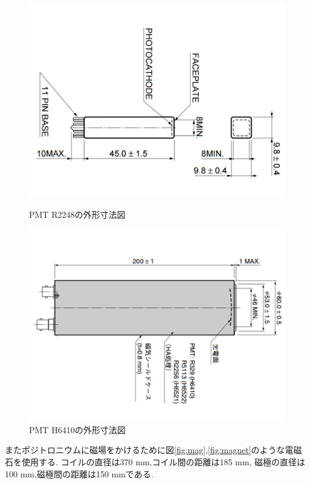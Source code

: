 \begin{figure}[htbp]
\begin{minipage}{0.5\hsize}
\centering
\includegraphics[keepaspectratio,angle=90,scale=0.4]{fig/ybm/pmtmini.pdf}
	\caption{PMT R2248の外形寸法図\cite{pmtshape}}
\label{fig:pmtmini}
\end{minipage}
\begin{minipage}{0.5\hsize}
\centering
\includegraphics[keepaspectratio,angle=90,scale=0.4]{fig/ybm/pmtbig.pdf}
	\caption{PMT H6410の外形寸法図\cite{pmtshape}}
\label{fig:pmtbig}
\end{minipage}
\end{figure}

またポジトロニウムに磁場をかけるために図\ref{fig:mag},\ref{fig:magnet}のような電磁石を使用する.
コイルの直径は370 mm,コイル間の距離は185 mm,
磁極の直径は100 mm,磁極間の距離は150 mmである.

